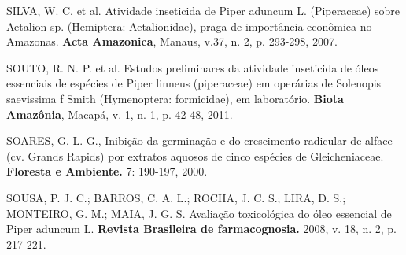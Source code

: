 \documentclass[article,12pt,onesidea,4paper,english,brazil]{abntex2}
\begin{document}
	\noindent SILVA, W. C. et al. Atividade inseticida de Piper aduncum L. (Piperaceae) sobre Aetalion sp. (Hemiptera: Aetalionidae), praga de importância econômica no Amazonas. \textbf{Acta Amazonica}, Manaus, v.37, n. 2, p. 293-298, 2007.
	
	\noindent SOUTO, R. N. P. et al. Estudos preliminares da atividade inseticida de óleos essenciais de espécies de Piper linneus (piperaceae) em operárias de Solenopis saevissima f Smith (Hymenoptera: formicidae), em laboratório. \textbf{Biota Amazônia}, Macapá, v. 1, n. 1, p. 42-48, 2011.
	
	\noindent SOARES, G. L. G., Inibição da germinação e do crescimento radicular de alface (cv. Grands Rapids) por extratos aquosos de cinco espécies de Gleicheniaceae. \textbf{Floresta e Ambiente.} 7: 190-197, 2000.
	
	\noindent SOUSA, P. J. C.; BARROS, C. A. L.; ROCHA, J. C. S.; LIRA, D. S.; MONTEIRO, G.
	M.; MAIA, J. G. S. Avaliação toxicológica do óleo essencial de Piper aduncum L.
	\textbf{Revista Brasileira de farmacognosia.} 2008, v. 18, n. 2, p. 217-221.
	
\end{document}
